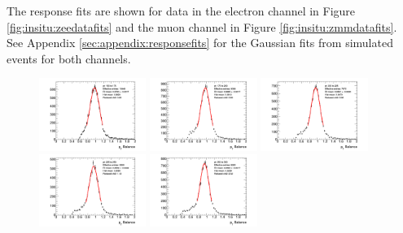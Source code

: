 The response fits are shown for data in the electron channel in Figure \ref{fig:insitu:zeedatafits} and the muon channel in Figure \ref{fig:insitu:zmmdatafits}. See Appendix \ref{sec:appendix:responsefits} for the Gaussian fits from simulated events for both channels. 
\begin{figure}[t]
    \centering
    \includegraphics[width=0.31\textwidth]{plots/insitu/fits_data_zee_nominal/Zeejet_Nominal_Bin2.png}
    \includegraphics[width=0.31\textwidth]{plots/insitu/fits_data_zee_nominal/Zeejet_Nominal_Bin3.png}
    \includegraphics[width=0.31\textwidth]{plots/insitu/fits_data_zee_nominal/Zeejet_Nominal_Bin4.png}
    \includegraphics[width=0.31\textwidth]{plots/insitu/fits_data_zee_nominal/Zeejet_Nominal_Bin5.png}
    \includegraphics[width=0.31\textwidth]{plots/insitu/fits_data_zee_nominal/Zeejet_Nominal_Bin6.png}

\end{figure}
